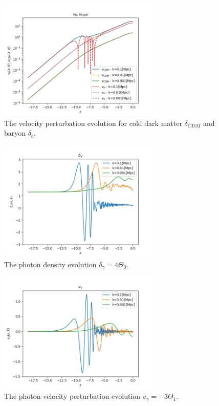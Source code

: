 \documentclass{aa}
\begin{document}
\begin{figure}[H]
	\centering
	\includegraphics[width=77mm]{v_.png}
	\caption{The velocity perturbation evolution for cold dark matter $\delta_{CDM}$ and baryon $\delta_b$.}
	\label{fig:v_}
\end{figure}
\begin{figure}[H]
	\centering
	\includegraphics[width=77mm]{delta_gamma.png}
	\caption{The photon density evolution $\delta_\gamma=4\Theta_0$.}
	\label{fig:delta_gamma}
\end{figure}
\begin{figure}[H]
	\centering
	\includegraphics[width=77mm]{v_gamma.png}
	\caption{The photon velocity perturbation evolution $v_\gamma=-3\Theta_1$.}
	\label{fig:v_gamma}
\end{figure}
\end{document}
